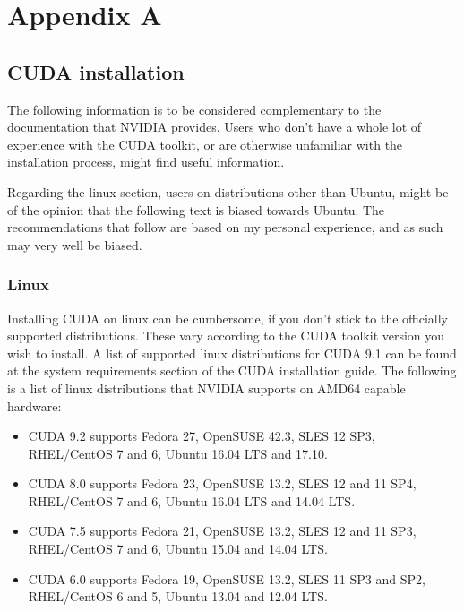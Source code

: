 \chapter*{Appendix A}

\section*{CUDA installation}

\hspace{4mm}The following information is to be considered complementary to the documentation that NVIDIA provides. Users who don't have a whole lot of experience with the CUDA toolkit, or are otherwise unfamiliar with the installation process, might find useful information.\vspace{5mm}

Regarding the linux section, users on distributions other than Ubuntu, might be of the opinion that the following text is biased towards Ubuntu. The recommendations that follow are based on my personal experience, and as such may very well be biased.

\subsection*{Linux}

\hspace{4mm}Installing CUDA on linux can be cumbersome, if you don't stick to the officially supported distributions. These vary according to the CUDA toolkit version you wish to install. A list of supported linux distributions for CUDA 9.1 can be found at the system requirements section of the CUDA installation guide\autocite[]{cuda_install_linux}. The following is a list of linux distributions that NVIDIA supports on AMD64 capable hardware:

\begin{itemize}
    \item CUDA 9.2 supports Fedora 27, OpenSUSE 42.3, SLES 12 SP3, RHEL/CentOS 7 and 6, Ubuntu 16.04 LTS and 17.10.
    \item CUDA 8.0 supports Fedora 23, OpenSUSE 13.2, SLES 12 and 11 SP4, RHEL/CentOS 7 and 6, Ubuntu 16.04 LTS and 14.04 LTS.
    \item CUDA 7.5 supports Fedora 21, OpenSUSE 13.2, SLES 12 and 11 SP3, RHEL/CentOS 7 and 6, Ubuntu 15.04 and 14.04 LTS.
    \item CUDA 6.0 supports Fedora 19, OpenSUSE 13.2, SLES 11 SP3 and SP2, RHEL/CentOS 6 and 5, Ubuntu 13.04 and 12.04 LTS.
\end{itemize}

